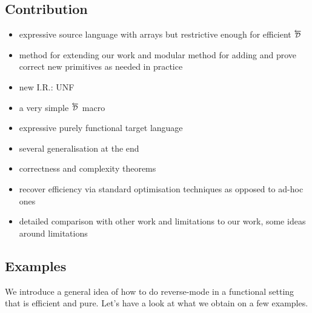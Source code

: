 \subsection{Contribution}

\begin{itemize}
    \item expressive source language with arrays but restrictive enough for efficient $\Dsynrevsymbol$
    \item method for extending our work and modular method for adding and prove correct new primitives as needed in practice 
    \item new I.R.: UNF
    \item a very simple $\Dsynrevsymbol$ macro
    \item expressive purely functional target language
    \item several generalisation at the end
    \item correctness and complexity theorems
    \item recover efficiency via standard optimisation techniques as opposed to ad-hoc ones
    \item detailed comparison with other work and limitations to our work, some ideas around limitations
\end{itemize}

\subsection{Examples}

We introduce a general idea of how to do reverse-mode in a functional setting that is efficient and pure. 
Let's have a look at what we obtain on a few examples.


